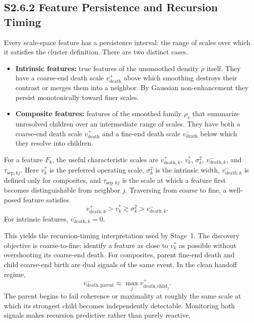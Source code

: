 \documentclass[11pt]{article}
\begin{document}
\subsection*{S2.6.2 Feature Persistence and Recursion Timing}
\label{sec:si-feature-persistence}
Every scale-space feature has a persistence interval: the range of scales over
which it satisfies the cluster definition. There are two distinct cases.
\begin{itemize}[leftmargin=1.5em]
  \item \textbf{Intrinsic features:} true features of the unsmoothed density
  $\rho$ itself. They have a coarse-end death scale
  $v_{\mathrm{death}}^+$ above which smoothing destroys their contrast or merges
  them into a neighbor. By Gaussian non-enhancement they persist monotonically
  toward finer scales.
  \item \textbf{Composite features:} features of the smoothed family $\rho_v$
  that summarize unresolved children over an intermediate range of scales. They
  have both a coarse-end death scale $v_{\mathrm{death}}^+$ and a fine-end death
  scale $v_{\mathrm{death}}^-$ below which they resolve into children.
\end{itemize}

For a feature $F_k$, the useful characteristic scales are
$v_{\mathrm{death},k}^+$, $v_k^\ast$, $\sigma_k^2$,
$v_{\mathrm{death},k}^-$, and $\tau_{\mathrm{sep},kj}$. Here $v_k^\ast$ is the
preferred operating scale, $\sigma_k^2$ is the intrinsic width,
$v_{\mathrm{death},k}^-$ is defined only for composites, and
$\tau_{\mathrm{sep},kj}$ is the scale at which a feature first becomes
distinguishable from neighbor $j$. Traversing from coarse to fine, a
well-posed feature satisfies
\[
v_{\mathrm{death},k}^+ > v_k^\ast \gtrsim \sigma_k^2 > v_{\mathrm{death},k}^-.
\]
For intrinsic features, $v_{\mathrm{death},k}^-=0$.

This yields the recursion-timing interpretation used by Stage~1. The discovery
objective is coarse-to-fine: identify a feature as close to $v_k^\ast$ as
possible without overshooting its coarse-end death. For composites, parent
fine-end death and child coarse-end birth are dual signals of the same event.
In the clean handoff regime,
\[
v_{\mathrm{death},\mathrm{parent}}^-
\approx
\max_j v_{\mathrm{death},\mathrm{child}_j}^+.
\]
The parent begins to fail coherence or maximality at roughly the same scale at
which its strongest child becomes independently detectable. Monitoring both
signals makes recursion predictive rather than purely reactive.
\end{document}
